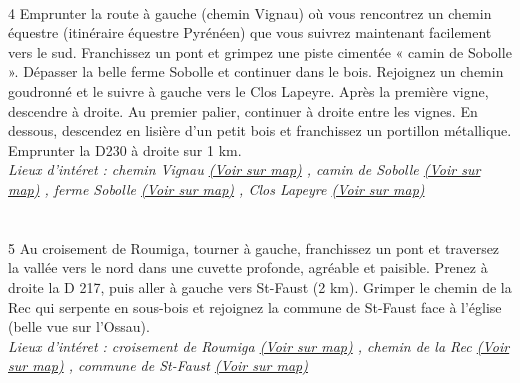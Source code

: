\documentclass{article}
\begin{document}
        \paragraph{}
        4
                        Emprunter la route à gauche (chemin Vignau) où vous rencontrez un chemin équestre (itinéraire équestre Pyrénéen) que vous suivrez maintenant facilement vers le sud. Franchissez un pont et grimpez une piste cimentée « camin de Sobolle ». Dépasser la belle ferme Sobolle et continuer dans le bois. Rejoignez un chemin goudronné et le suivre à gauche vers le Clos Lapeyre. Après la première vigne, descendre à droite. Au premier palier, continuer à droite entre les vignes. En dessous, descendez en lisière d'un petit bois et franchissez un portillon métallique. Emprunter la D230 à droite sur 1 km.
                    \\
        \emph{Lieux d'intéret : chemin
                            Vignau 
        \href{https://www.google.com/maps/?q=43.287530, -0.391115}{(Voir sur map)}
        ,  camin de
                            Sobolle 
        \href{https://www.google.com/maps/?q=43.287530, -0.391115}{(Voir sur map)}
        , ferme Sobolle 
        \href{https://www.google.com/maps/?q=43.287530, -0.391115}{(Voir sur map)}
        , Clos Lapeyre 
        \href{https://www.google.com/maps/?q=43.287530, -0.391115}{(Voir sur map)}
        }\\~\\

        \paragraph{}
        5
                        Au croisement de Roumiga, tourner à gauche, franchissez un pont et traversez la vallée vers le nord dans une cuvette profonde, agréable et paisible. Prenez à droite la D 217, puis aller à gauche vers St-Faust (2 km). Grimper le chemin de la Rec qui serpente en sous-bois et rejoignez la commune de St-Faust face à l'église (belle vue sur l'Ossau).
                    \\
        \emph{Lieux d'intéret : croisement de
                            Roumiga 
        \href{https://www.google.com/maps/?q=43.287530, -0.391115}{(Voir sur map)}
        , chemin de la
                            Rec 
        \href{https://www.google.com/maps/?q=43.287530, -0.391115}{(Voir sur map)}
        , commune de
                            St-Faust 
        \href{https://www.google.com/maps/?q=43.287530, -0.391115}{(Voir sur map)}
        }\\~\\
\end{document}
